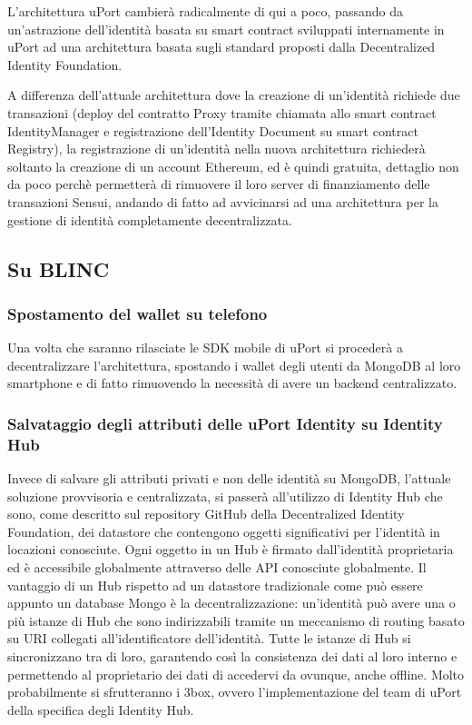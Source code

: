 L’architettura uPort cambierà radicalmente di qui a poco, passando da un’astrazione
dell’identità basata su smart contract sviluppati internamente in uPort ad una architettura
basata sugli standard proposti dalla Decentralized Identity Foundation.

A differenza dell’attuale architettura dove la creazione di un’identità richiede
due transazioni (deploy del contratto Proxy tramite chiamata allo smart contract IdentityManager
e registrazione dell’Identity Document su smart contract Registry), la registrazione
di un’identità nella nuova architettura richiederà soltanto
la creazione di un account Ethereum, ed è quindi gratuita, dettaglio non da poco perchè
permetterà di rimuovere il loro server di finanziamento delle transazioni Sensui, andando di fatto ad
avvicinarsi ad una architettura per la gestione di identità completamente decentralizzata.

\subsection{Su BLINC}

\subsubsection{Spostamento del wallet su telefono}

Una volta che saranno rilasciate le SDK mobile di uPort si procederà a decentralizzare
l’architettura, spostando i wallet degli utenti da MongoDB al loro smartphone e di fatto
rimuovendo la necessità di avere un backend centralizzato.

\subsubsection{Salvataggio degli attributi delle uPort Identity su Identity Hub}

Invece di salvare gli attributi privati e non delle identità su MongoDB, l’attuale soluzione provvisoria
e centralizzata, si passerà all’utilizzo di Identity Hub che sono, come descritto
sul repository GitHub della Decentralized Identity Foundation, dei datastore che contengono
oggetti significativi per l’identità in locazioni conosciute. Ogni oggetto in un Hub è firmato
dall’identità proprietaria ed è accessibile globalmente attraverso delle API conosciute globalmente.
Il vantaggio di un Hub rispetto ad un datastore tradizionale come può essere appunto un database
Mongo è la decentralizzazione: un’identità può avere una o più istanze di Hub che sono indirizzabili
tramite un meccanismo di routing basato su URI collegati all’identificatore dell’identità.
Tutte le istanze di Hub si sincronizzano tra di loro, garantendo così la consistenza dei dati
al loro interno e permettendo al proprietario dei dati di accedervi da ovunque, anche offline.
Molto probabilmente si sfrutteranno i 3box,
ovvero l’implementazione del team di uPort della specifica degli Identity Hub.
